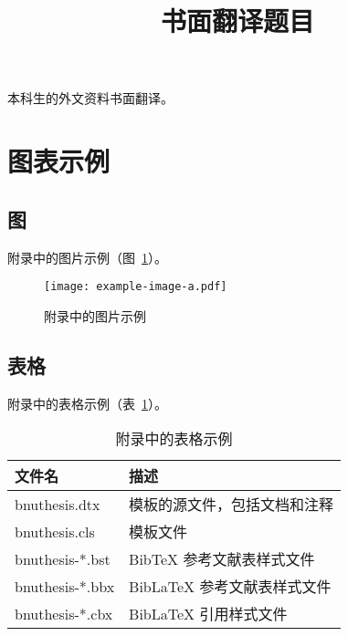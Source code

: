 
\begin{translation}
\label{cha:translation}

\title{书面翻译题目}
\maketitle

\tableofcontents


本科生的外文资料书面翻译。


\section{图表示例}

\subsection{图}

附录中的图片示例（图~\ref{fig:appendix-translation-figure}）。

\begin{figure}
  \centering
  \texttt{[image: example-image-a.pdf]}
  \caption{附录中的图片示例}
  \label{fig:appendix-translation-figure}
\end{figure}


\subsection{表格}

附录中的表格示例（表~\ref{tab:appendix-translation-table}）。

\begin{table}
  \centering
  \caption{附录中的表格示例}
  \begin{tabular}{ll}
    \toprule
    文件名          & 描述                         \\
    \midrule
    bnuthesis.dtx   & 模板的源文件，包括文档和注释 \\
    bnuthesis.cls   & 模板文件                     \\
    bnuthesis-*.bst & BibTeX 参考文献表样式文件    \\
    bnuthesis-*.bbx & BibLaTeX 参考文献表样式文件  \\
    bnuthesis-*.cbx & BibLaTeX 引用样式文件        \\
    \bottomrule
  \end{tabular}
  \label{tab:appendix-translation-table}
\end{table}



\end{translation}
